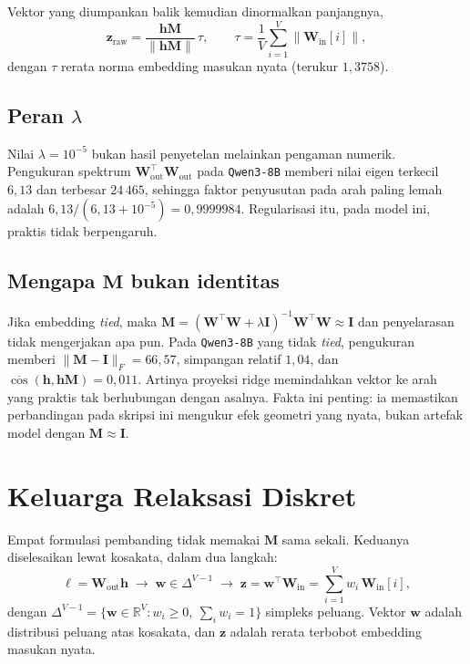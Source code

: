 \documentclass{laporanta1statugm}
\newcommand{\code}[1]{\texttt{#1}}
\begin{document}
Vektor yang diumpankan balik kemudian dinormalkan panjangnya,
\begin{equation}
  \bm{z}_{\text{raw}} = \frac{\bm{h}\bm{M}}{\lVert\bm{h}\bm{M}\rVert}\,\tau,
  \qquad
  \tau = \frac{1}{V}\sum_{i=1}^{V}\bigl\lVert\bm{W}_{\text{in}}[i]\bigr\rVert ,
  \label{eq:raw}
\end{equation}
dengan $\tau$ rerata norma embedding masukan nyata (terukur $1{,}3758$).

\subsection{\texorpdfstring{Peran $\lambda$}{Peran lambda}}

Nilai $\lambda = 10^{-5}$ bukan hasil penyetelan melainkan pengaman numerik.
Pengukuran spektrum $\bm{W}_{\text{out}}^{\top}\bm{W}_{\text{out}}$ pada
\code{Qwen3-8B} memberi nilai eigen terkecil $6{,}13$ dan terbesar $24\,465$,
sehingga faktor penyusutan pada arah paling lemah adalah
$6{,}13/(6{,}13+10^{-5}) = 0{,}9999984$. Regularisasi itu, pada model ini,
praktis tidak berpengaruh.

\subsection{\texorpdfstring{Mengapa $\bm{M}$ bukan identitas}{Mengapa M bukan identitas}}

Jika embedding \textit{tied}, maka
$\bm{M} = (\bm{W}^\top\bm{W}+\lambda\bm{I})^{-1}\bm{W}^\top\bm{W}\approx\bm{I}$
dan penyelarasan tidak mengerjakan apa pun. Pada \code{Qwen3-8B} yang
tidak \textit{tied}, pengukuran memberi $\lVert\bm{M}-\bm{I}\rVert_F = 66{,}57$,
simpangan relatif $1{,}04$, dan $\overline{\cos}(\bm{h},\bm{h}\bm{M}) = 0{,}011$.
Artinya proyeksi ridge memindahkan vektor ke arah yang praktis tak berhubungan
dengan asalnya. Fakta ini penting: ia memastikan perbandingan pada skripsi ini
mengukur efek geometri yang nyata, bukan artefak model dengan
$\bm{M}\approx\bm{I}$.

\section{Keluarga Relaksasi Diskret}

Empat formulasi pembanding tidak memakai $\bm{M}$ sama sekali. Keduanya
diselesaikan lewat kosakata, dalam dua langkah:
\begin{equation}
  \bm{\ell} = \bm{W}_{\text{out}}\bm{h}
  \;\longrightarrow\;
  \bm{w}\in\Delta^{V-1}
  \;\longrightarrow\;
  \bm{z} = \bm{w}^{\top}\bm{W}_{\text{in}}
  = \sum_{i=1}^{V} w_i\,\bm{W}_{\text{in}}[i],
  \label{eq:umum}
\end{equation}
dengan $\Delta^{V-1} = \{\bm{w}\in\mathbb{R}^V : w_i\ge 0,\ \sum_i w_i = 1\}$
simpleks peluang. Vektor $\bm{w}$ adalah distribusi peluang atas kosakata, dan
$\bm{z}$ adalah rerata terbobot embedding masukan nyata.
\end{document}
